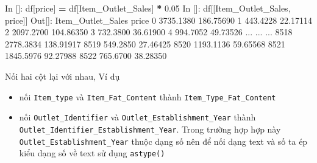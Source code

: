\documentclass[
]{book}
\newenvironment{Shaded}{\begin{snugshade}}{\end{snugshade}}
\newcommand{\DecValTok}[1]{\textcolor[rgb]{0.00,0.00,0.81}{#1}}
\newcommand{\FloatTok}[1]{\textcolor[rgb]{0.00,0.00,0.81}{#1}}
\newcommand{\NormalTok}[1]{#1}
\newcommand{\OperatorTok}[1]{\textcolor[rgb]{0.81,0.36,0.00}{\textbf{#1}}}
\newcommand{\StringTok}[1]{\textcolor[rgb]{0.31,0.60,0.02}{#1}}
\begin{document}
\begin{Shaded}
\begin{Highlighting}[]
\NormalTok{In []: df[}\StringTok{\textquotesingle{}price\textquotesingle{}}\NormalTok{] }\OperatorTok{=}\NormalTok{ df[}\StringTok{\textquotesingle{}Item\_Outlet\_Sales\textquotesingle{}}\NormalTok{] }\OperatorTok{*} \FloatTok{0.05}
\NormalTok{In []: df[[}\StringTok{\textquotesingle{}Item\_Outlet\_Sales\textquotesingle{}}\NormalTok{, }\StringTok{\textquotesingle{}price\textquotesingle{}}\NormalTok{]]}
\NormalTok{Out[]:}
\NormalTok{      Item\_Outlet\_Sales      price}
\DecValTok{0}             \FloatTok{3735.1380}  \FloatTok{186.75690}
\DecValTok{1}              \FloatTok{443.4228}   \FloatTok{22.17114}
\DecValTok{2}             \FloatTok{2097.2700}  \FloatTok{104.86350}
\DecValTok{3}              \FloatTok{732.3800}   \FloatTok{36.61900}
\DecValTok{4}              \FloatTok{994.7052}   \FloatTok{49.73526}
\NormalTok{...                 ...        ...}
\DecValTok{8518}          \FloatTok{2778.3834}  \FloatTok{138.91917}
\DecValTok{8519}           \FloatTok{549.2850}   \FloatTok{27.46425}
\DecValTok{8520}          \FloatTok{1193.1136}   \FloatTok{59.65568}
\DecValTok{8521}          \FloatTok{1845.5976}   \FloatTok{92.27988}
\DecValTok{8522}           \FloatTok{765.6700}   \FloatTok{38.28350}
\end{Highlighting}
\end{Shaded}

Nối hai cột lại với nhau, Ví dụ

\begin{itemize}
\item
  nối \texttt{Item\_type} và \texttt{Item\_Fat\_Content} thành \texttt{Item\_Type\_Fat\_Content}
\item
  nối \texttt{Outlet\_Identifier} và \texttt{Outlet\_Establishment\_Year} thành \texttt{Outlet\_Identifier\_Establishment\_Year}. Trong trường hợp hợp này \texttt{Outlet\_Establishment\_Year} thuộc dạng số nên để nối dạng text và số ta ép kiểu dạng số về text sử dụng \texttt{astype()}
\end{itemize}
\end{document}
